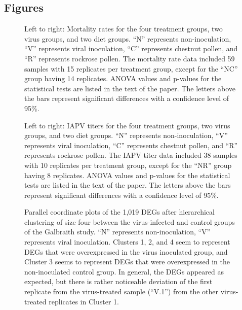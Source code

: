 \documentclass{bmcart}
\begin{document}
\begin{linenumbers}
\begin{backmatter}
\newpage
\section*{Figures}

\begin{figure}[h!]
\caption{
Left to right: Mortality rates for the four treatment groups, two virus groups, and two diet groups. ``N'' represents non-inoculation, ``V'' represents viral inoculation, ``C'' represents chestnut pollen, and ``R'' represents rockrose pollen. The mortality rate data included 59 samples with 15 replicates per treatment group, except for the ``NC'' group having 14 replicates. ANOVA values and p-values for the statistical tests are listed in the text of the paper. The letters above the bars represent significant differences with a confidence level of 95\%.}
\end{figure}

\begin{figure}[h!]
\caption{
Left to right: IAPV titers for the four treatment groups, two virus groups, and two diet groups. ``N'' represents non-inoculation, ``V'' represents viral inoculation, ``C'' represents chestnut pollen, and ``R'' represents rockrose pollen. The IAPV titer data included 38 samples with 10 replicates per treatment group, except for the ``NR'' group having 8 replicates. ANOVA values and p-values for the statistical tests are listed in the text of the paper. The letters above the bars represent significant differences with a confidence level of 95\%.}
\end{figure}

\begin{figure}[h!]
\caption{
Parallel coordinate plots of the 1,019 DEGs after hierarchical clustering of size four between the virus-infected and control groups of the Galbraith study. ``N'' represents non-inoculation, ``V'' represents viral inoculation. Clusters 1, 2, and 4 seem to represent DEGs that were overexpressed in the virus inoculated group, and Cluster 3 seems to represent DEGs that were overexpressed in the non-inoculated control group. In general, the DEGs appeared as expected, but there is rather noticeable deviation of the first replicate from the virus-treated sample (``V.1'') from the other virus-treated replicates in Cluster 1.}
\end{figure}


\end{backmatter}
\end{linenumbers}
\end{document}
